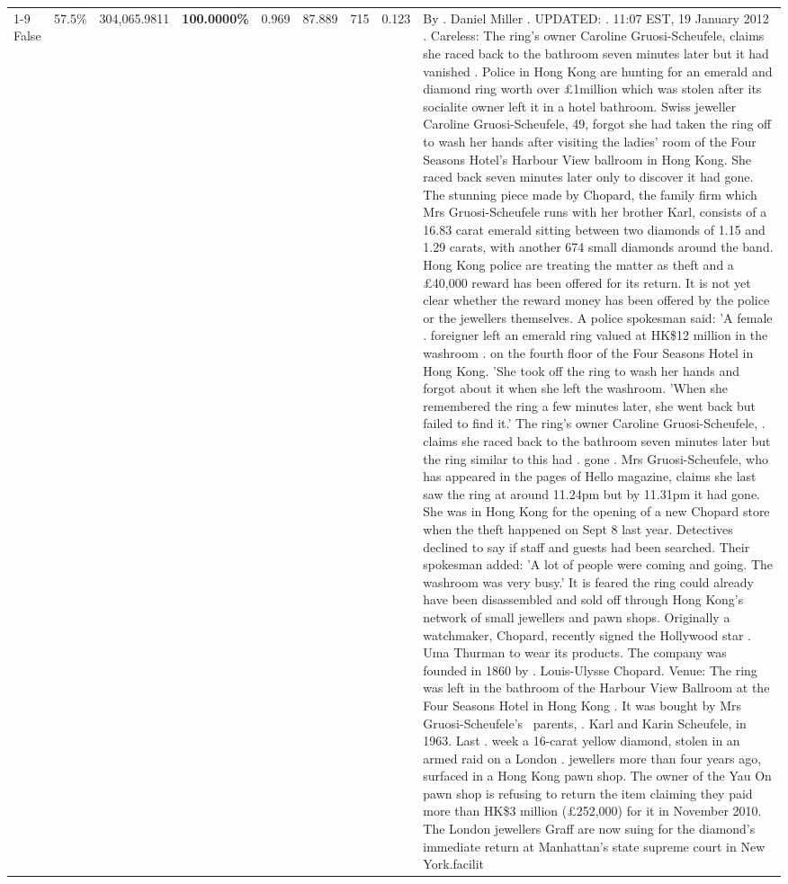 \begin{table}[H]
\begin{tabular}{lllrlllll}
\cline{1-9} \cline{2-9}
False & 57.5\% & \color{red} 304,065.9811 & \bfseries \color{red} 100.0000\% & 0.969 & 87.889 & 715 & 0.123 & By . Daniel Miller . UPDATED: . 11:07 EST, 19 January 2012 . Careless: The ring's owner Caroline Gruosi-Scheufele, claims she raced back to the bathroom seven minutes later but it had vanished . Police in Hong Kong are hunting for an emerald and diamond ring worth over £1million which was stolen after its socialite owner left it in a hotel bathroom. Swiss jeweller Caroline Gruosi-Scheufele, 49, forgot she had taken the ring off to wash her hands after visiting the ladies' room of the Four Seasons Hotel's Harbour View ballroom in Hong Kong. She raced back seven minutes later only to discover it had gone. The stunning piece made by Chopard, the family firm which Mrs Gruosi-Scheufele runs with her brother Karl, consists of a 16.83 carat emerald sitting between two diamonds of 1.15 and 1.29 carats, with another 674 small diamonds around the band. Hong Kong police are treating the matter as theft and a £40,000 reward has been offered for its return. It is not yet clear whether the reward money has been offered by the police or the jewellers themselves. A police spokesman said: 'A female . foreigner left an emerald ring valued at HK\$12 million in the washroom . on the fourth floor of the Four Seasons Hotel in Hong Kong. 'She took off the ring to wash her hands and forgot about it when she left the washroom. 'When she remembered the ring a few minutes later, she went back but failed to find it.' The ring's owner Caroline Gruosi-Scheufele, . claims she raced back to the bathroom seven minutes later but the ring similar to this had . gone . Mrs Gruosi-Scheufele, who has appeared in the pages of Hello magazine, claims she last saw the ring at around 11.24pm but by 11.31pm it had gone. She was in Hong Kong for the opening of a new Chopard store when the theft happened on Sept 8 last year. Detectives declined to say if staff and guests had been searched. Their spokesman added: 'A lot of people were coming and going. The washroom was very busy.' It is feared the ring could already have been disassembled and sold off through Hong Kong's network of small jewellers and pawn shops. Originally a watchmaker, Chopard, recently signed the Hollywood star . Uma Thurman to wear its products. The company was founded in 1860 by . Louis-Ulysse Chopard. Venue: The ring was left in the bathroom of the Harbour View Ballroom at the Four Seasons Hotel in Hong Kong . It was bought by Mrs Gruosi-Scheufele's  parents, . Karl and Karin Scheufele, in 1963. Last . week a 16-carat yellow diamond, stolen in an armed raid on a London . jewellers more than four years ago, surfaced in a Hong Kong pawn shop. The owner of the Yau On pawn shop is refusing to return the item claiming they paid more than HK\$3 million (£252,000) for it in November 2010. The London jewellers Graff are now suing for the diamond’s immediate return at Manhattan’s state supreme court in New York.facilit \\

\end{tabular}
\end{table}

